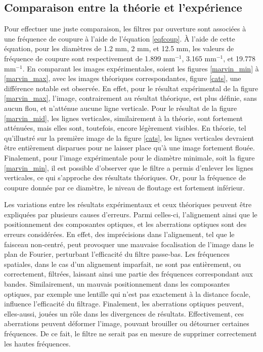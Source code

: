 \documentclass[11pt,letterpaper]{article}
\begin{document}
\subsection{Comparaison entre la théorie et l'expérience}\label{comptheoexp}
Pour effectuer une juste comparaison, les filtres par ouverture sont associées à une fréquence de coupure à l'aide de l'équation \ref{eqfcoup}. À l'aide de cette équation, pour les diamètres de 1.2 mm, 2 mm, et 12.5 mm, les valeurs de fréquence de coupure sont respectivement de 1.899 mm$^{-1}$, 3.165 mm$^{-1}$, et 19.778 mm$^{-1}$. En comparant les images expérimentales, soient les figures \ref{marvin_min} à \ref{marvin_max}, avec les images théoriques correspondantes, figure \ref{cats}, une différence notable est observée. En effet, pour le résultat expérimental de la figure \ref{marvin_max}, l'image, contrairement au résultat théorique, est plus définie, sans aucun flou, et n'atténue aucune ligne verticale. Pour le résultat de la figure \ref{marvin_mid}, les lignes verticales, similairement à la théorie, sont fortement atténuées, mais elles sont, toutefois, encore légèrement visibles. En théorie, tel qu'illustré sur la première image de la figure \ref{cats}, les lignes verticales devraient être entièrement disparues pour ne laisser place qu'à une image fortement flouée. Finalement, pour l'image expérimentale pour le diamètre minimale, soit la figure \ref{marvin_min}, il est possible d'observer que le filtre a permis d'enlever les lignes verticales, ce qui s'approche des résultats théoriques. Or, pour la fréquence de coupure donnée par ce diamètre, le niveau de floutage est fortement inférieur.

Les variations entre les résultats expérimentaux et ceux théoriques peuvent être expliquées par plusieurs causes d'erreurs. Parmi celles-ci, l'alignement ainsi que le positionnement des composantes optiques, et les aberrations optiques sont des erreurs considérées. En effet, des imprécisions dans l'alignement, tel que le faisceau non-centré, peut provoquer une mauvaise focalisation de l'image dans le plan de Fourier, perturbant l'efficacité du filtre passe-bas. Les fréquences spatiales, dans le cas d'un alignement imparfait, ne sont pas entièrement, ou correctement, filtrées, laissant ainsi une partie des fréquences correspondant aux bandes. Similairement, un mauvais positionnement dans les composantes optiques, par exemple une lentille qui n'est pas exactement à la distance focale, influence l'efficacité du filtrage. Finalement, les aberrations optiques peuvent, elles-aussi, jouées un rôle dans les divergences de résultats. Effectivement, ces aberrations peuvent déformer l'image, pouvant brouiller ou détourner certaines fréquences. De ce fait, le filtre ne serait pas en mesure de supprimer correctement les hautes fréquences.
\end{document}
